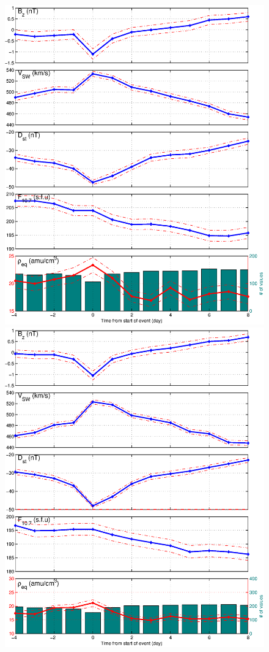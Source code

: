 \documentclass[10pt,twocolumn]{article}
\begin{document}
\begin{figure}[htp!]
\centering
\includegraphics[scale=0.45]{paperfigures/stormavs-dst-50-tak.eps}
\includegraphics[scale=0.45]{paperfigures/stormavs-dst-day.eps}

\end{figure}
\end{document}
